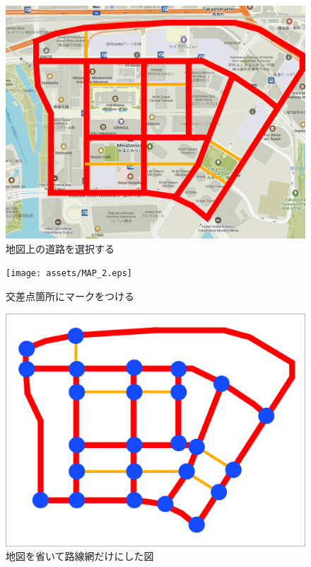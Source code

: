 \begin{figure}[H]
    \centering  %
    \includegraphics[clip,width = 13.0cm]{assets/MAP_1.eps}
    \caption{地図上の道路を選択する}  \label{sample}
\end{figure}


\begin{figure}[H]
    \centering  %
    \texttt{[image: assets/MAP\_2.eps]}
    \caption{交差点箇所にマークをつける}  \label{sample}
\end{figure}


\begin{figure}[H]
    \centering  %
    \includegraphics[clip,width = 13.0cm]{assets/MAP_3.eps}
    \caption{地図を省いて路線網だけにした図}  \label{sample}
\end{figure}


